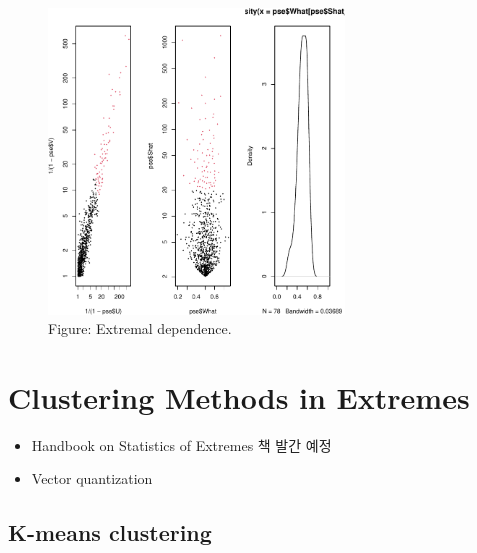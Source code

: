 \documentclass[
  letterpaper,
  DIV=11,
  numbers=noendperiod]{scrreprt}
\theoremstyle{plain}
\theoremstyle{definition}
\theoremstyle{definition}
\theoremstyle{plain}
\theoremstyle{plain}
\theoremstyle{remark}
\begin{document}
\begin{figure}[H]

{\centering \includegraphics[width=0.7\textwidth,height=\textheight]{mev_files/figure-pdf/unnamed-chunk-1-1.pdf}

}

\caption{Figure: Extremal dependence.}

\end{figure}%

\section{Clustering Methods in
Extremes}\label{clustering-methods-in-extremes}

\begin{itemize}
\item
  Handbook on Statistics of Extremes 책 발간 예정
\item
  Vector quantization
\end{itemize}

\subsection{K-means clustering}\label{k-means-clustering}
\end{document}
